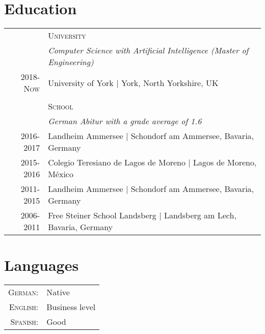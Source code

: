 \documentclass[a4paper,10pt]{article}
\begin{document}
\section{Education}

\begin{tabular}{r|p{11cm}}

                    & \textsc{University} \\
                    & \emph{Computer Science with Artificial Intelligence (Master of Engineering)} \\
\textsc{2018-Now}  & University of York | York, North Yorkshire, UK \\
\multicolumn{2}{c}{}\\
                    & \textsc{School} \\
                    & \emph{German \emph{Abitur} with a grade average of 1.6} \\
\textsc{2016-2017}  & Landheim Ammersee | Schondorf am Ammersee, Bavaria, Germany \\
\textsc{2015-2016}  & Colegio Teresiano de Lagos de Moreno |  Lagos de Moreno, México \\
\textsc{2011-2015}  & Landheim Ammersee | Schondorf am Ammersee, Bavaria, Germany \\
\textsc{2006-2011}  & Free Steiner School Landsberg | Landsberg am Lech, Bavaria, Germany \\

\end{tabular}


\section{Languages}
\begin{tabular}{rl}
\textsc{German:}  & Native \\
\textsc{English:} & Business level \\
\textsc{Spanish:} & Good \\
\end{tabular}
\end{document}
